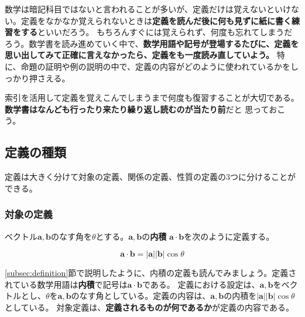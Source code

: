 \documentclass{jlreq}
\begin{document}
\begin{tcolorbox}[enhanced, title=コラム 定義の覚え方, breakable, colback=white, drop fuzzy shadow, attach boxed title to top center={yshift*=0.1cm}]
  数学は暗記科目ではないと言われることが多いが、定義だけは覚えないといけない。定義をなかなか覚えられないときは\textbf{定義を読んだ後に何も見ずに紙に書く練習をする}といいだろう。
  もちろんすぐには覚えられず、何度も忘れてしまうだろう。数学書を読み進めていく中で、\textbf{数学用語や記号が登場するたびに、定義を思い出してみて正確に言えなかったら、定義をも一度読み直していよう。}
  特に、命題の証明や例の説明の中で、定義の内容がどのように使われているかをしっかり押さえる。

  索引を活用して定義を覚えこんでしまうまで何度も復習することが大切である。\textbf{数学書はなんども行ったり来たり繰り返し読むのが当たり前}だと
  思っておこう。
\end{tcolorbox}

\subsection{定義の種類}
定義は大きく分けて対象の定義、関係の定義、性質の定義の3つに分けることができる。

\subsubsection{対象の定義}

\begin{tcolorbox}[enhanced,title=例1, 
  attach boxed title to top left, 
  colback=white!95!blue,
  colbacktitle=white!10!blue!50!black,
  drop fuzzy shadow,
  boxrule=0.25mm,
  ]
  ベクトル$\boldsymbol{a}, \boldsymbol{b}$のなす角を$\theta$とする。$\boldsymbol{a}, \boldsymbol{b}$の\textbf{内積} $\boldsymbol{a} \cdot \boldsymbol{b}$を次のように定義する。

  \begin{equation*}
    \boldsymbol{a} \cdot \boldsymbol{b} = |\boldsymbol{a}||\boldsymbol{b}|\cos \theta
  \end{equation*}
\end{tcolorbox}

\ref{subsec:definition}節で説明したように、内積の定義も読んでみましょう。定義されている数学用語は\textbf{内積}で記号は$\boldsymbol{a} \cdot \boldsymbol{b}$である。
定義における設定は、$\boldsymbol{a}, \boldsymbol{b}$をベクトルとし、$\theta$を$\boldsymbol{a}, \boldsymbol{b}$のなす角としている。定義の内容は、$\boldsymbol{a}, \boldsymbol{b}$の内積を$|\boldsymbol{a}||\boldsymbol{b}|\cos \theta$としている。
対象定義は、\textbf{定義されるものが何であるか}が定義の内容である。
\end{document}
